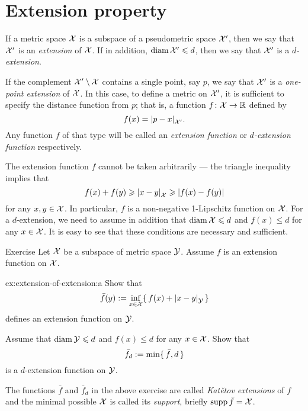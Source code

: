 \section{Extension property}
\label{sec:Extension property}

If a metric space $\mathcal{X}$ is a subspace of a pseudometric space $\mathcal{X}'$, then we say that $\mathcal{X}'$ is an \emph{extension} of $\mathcal{X}$.
If in addition, $\operatorname{\rm diam}\nolimits\mathcal{X}'\leqslant d$, then we say that $\mathcal{X}'$ is a {}\emph{$d$-extension}.

If the complement $\mathcal{X}'\setminus \mathcal{X}$ contains a single point, say $p$, we say that $\mathcal{X}'$ is a \emph{one-point extension} of $\mathcal{X}$.
In this case, to define a metric on $\mathcal{X}'$, it is sufficient to specify the distance function from $p$; that is, a function $f\colon\mathcal{X}\to\mathbb{R}$ defined by 
\[f(x)=\dist{p}{x}{\spc{X}'}.\]
Any function $f$ of that type will be called an \emph{extension function}\label{page:extension function} or {}\emph{$d$-extension function} respectively.

The extension function $f$ cannot be taken arbitrarily --- the triangle inequality implies that 
\[f(x)+f(y)\ge \dist{x}{y}{\spc{X}}\ge |f(x)-f(y)|\]
for any $x,y\in \mathcal{X}$.
In particular, $f$ is a non-negative 1-Lipschitz function on $\mathcal{X}$.
For a $d$-extension, we need to assume in addition that $\diam\spc{X}\z\le d$ and $f(x)\le d$ for any $x\in \mathcal{X}$.
It is easy to see that these conditions are necessary and sufficient.

\begin{thm}{Exercise}\label{ex:extension-of-extension}
Let $\mathcal{X}$ be a subspace of metric space $\mathcal{Y}$.
Assume $f$ is an extension function on $\mathcal{X}$.

\begin{subthm}{ex:extension-of-extension:a}
Show that 
\[\bar f(y)
\df
\inf_{x\in \spc{X}} \{\,f(x)+\dist{x}{y}{\spc{Y}}\,\}\]
defines an extension function on $\mathcal{Y}$.
\end{subthm}

\begin{subthm}{}
Assume that $\operatorname{\rm diam}\nolimits \mathcal{Y}\leqslant d$ and $f(x)\le d$ for any $x\in  \mathcal{X}$.
Show that 
\[\bar f_d
\mathrel{:=}
\min \{\, \bar f,d\,\}\]
is a $d$-extension function on $\mathcal{Y}$.
\end{subthm}

\end{thm}

The functions $\bar f$ and $\bar f_d$ in the above exercise are called \emph{Katětov extensions} of $f$ and the minimal possible $\mathcal{X}$ is called its \emph{support}, briefly \index{$\supp$}$\operatorname{\rm supp}\nolimits \bar f=\mathcal{X}$.

